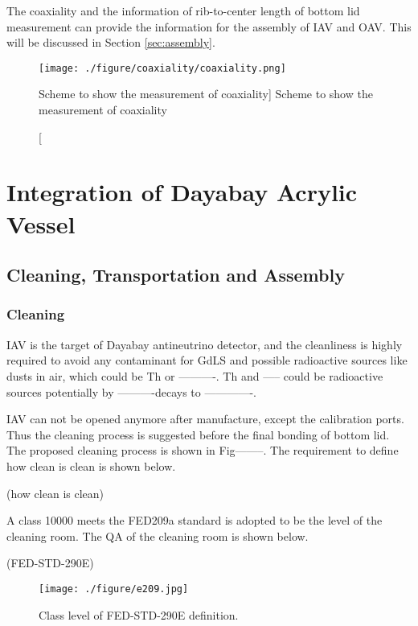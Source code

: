 The coaxiality and the information of rib-to-center length of bottom lid measurement can
provide the information for the assembly of IAV and OAV. This will be discussed in Section \ref{sec:assembly}.


\begin{figure}
    \centering
    \texttt{[image: ./figure/coaxiality/coaxiality.png]}
    \caption
    [Scheme to show the measurement of coaxiality]
    {Scheme to show the measurement of coaxiality}
    \label{fig:coaxiality.png}
    \end{figure}




\section {Integration of Dayabay Acrylic Vessel}

\subsection {Cleaning, Transportation and Assembly}


\subsubsection {Cleaning}

IAV is the target of Dayabay antineutrino detector,
and the cleanliness is highly required to avoid any contaminant
for GdLS and possible radioactive sources like dusts in air, which
could be Th or ----------. Th and ----- could be radioactive sources potentially
by ----------decays to -------------.

IAV can not be opened anymore after manufacture, except the calibration ports.
Thus the cleaning process is suggested before the final bonding of bottom lid.
The proposed cleaning process is shown in Fig--------. The requirement to define
how clean is clean is shown below.


(how clean is clean)



A class 10000 meets the FED209a standard is adopted to be the level of the cleaning room.
The QA of the cleaning room is shown below.

(FED-STD-290E)

\begin{figure}
    \centering
    \texttt{[image: ./figure/e209.jpg]}
    \caption{Class level of FED-STD-290E definition.}
    \label{e209.jpg}
    \end{figure}





